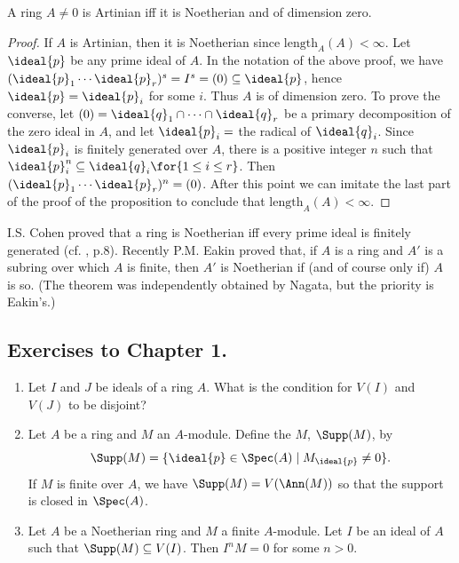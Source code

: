 \documentclass[../main]{subfiles}
\begin{document}
\begin{corollary*}
A ring $A\neq 0$ is Artinian iff it is Noetherian and of dimension zero.
\end{corollary*}
\begin{proof}
If $A$ is Artinian, then it is Noetherian since $\mathrm{length}_A(A)<\infty$. 
Let $\ideal{p}$ be any prime ideal of $A$. In the notation of the above proof, we have $(\ideal{p}_1\cdots\ideal{p}_r)^s=I^s=(0)\subseteq\ideal{p}$, hence $\ideal{p}=\ideal{p}_i$ for some $i$. Thus $A$ is of dimension zero. 
To prove the converse, let $(0)=\ideal{q}_1\cap\cdots\cap\ideal{q}_r$ be a primary decomposition of the zero ideal in $A$, and let $\ideal{p}_i=$ the radical of $\ideal{q}_i$. Since $\ideal{p}_i$ is finitely generated over $A$, there is a positive integer $n$ such that $\ideal{p}_i^n\subseteq\ideal{q}_i\for{1\leq i\leq r}$. Then $(\ideal{p}_1\cdots\ideal{p}_r)^n=(0)$. After this point we can imitate the last part of the proof of the proposition to conclude that $\mathrm{length}_A(A)<\infty$.
\end{proof}

\newparagraph
I.S. Cohen proved that a ring is Noetherian iff every prime ideal is finitely generated (cf. \cite{nagata1975local}, p.8). Recently P.M. Eakin \cite{eakin1968the} proved that, if $A$ is a ring and $A'$ is a subring over which $A$ is finite, then $A'$ is Noetherian if (and of course only if) $A$ is so. (The theorem was independently obtained by Nagata, but the priority is Eakin's.)

\subsection*{Exercises to Chapter 1.}
\begin{enumerate}
    \item Let $I$ and $J$ be ideals of a ring $A$. What is the condition for $V(I)$ and $V(J)$ to be disjoint?
    \item Let $A$ be a ring and $M$ an $A$-module. Define the $M$, $\Supp(M)$, by \[\Supp(M)=\{\ideal{p}\in\Spec(A)\mid M_{\ideal{p}}\neq 0\}.\] If $M$ is finite over $A$, we have $\Supp(M)=V(\Ann(M))$ so that the support is closed in $\Spec(A)$.
    \item Let $A$ be a Noetherian ring and $M$ a finite $A$-module. Let $I$ be an ideal of $A$ such that $\Supp(M)\subseteq V(I)$. Then $I^nM=0$ for some $n>0$.
\end{enumerate}
\end{document}
